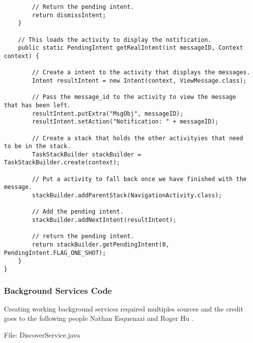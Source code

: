 \begin{lstlisting}
        // Return the pending intent.
        return dismissIntent;
    }

    // This loads the activity to display the notification.
    public static PendingIntent getRealIntent(int messageID, Context context) {

        // Create a intent to the activity that displays the messages.
        Intent resultIntent = new Intent(context, ViewMessage.class);

        // Pass the message_id to the activity to view the message that has been left.
        resultIntent.putExtra("MsgObj", messageID);
        resultIntent.setAction("Notification: " + messageID);

        // Create a stack that holds the other activityies that need to be in the stack.
        TaskStackBuilder stackBuilder = TaskStackBuilder.create(context);

        // Put a activity to fall back once we have finished with the message.
        stackBuilder.addParentStack(NavigationActivity.class);

        // Add the pending intent.
        stackBuilder.addNextIntent(resultIntent);

        // return the pending intent.
        return stackBuilder.getPendingIntent(0, PendingIntent.FLAG_ONE_SHOT);
    }
}

\end{lstlisting}

\subsubsection{Background Services Code}

Creating working background services required multiples sources and the credit goes to the following people Nathan Esquenazi \cite{NathanEsquenazi:StartingBackgroundServices:2013:online} and Roger Hu \cite{RogerHu:StartingBackgroundServices:2015:online}.

File: DiscoverService.java

